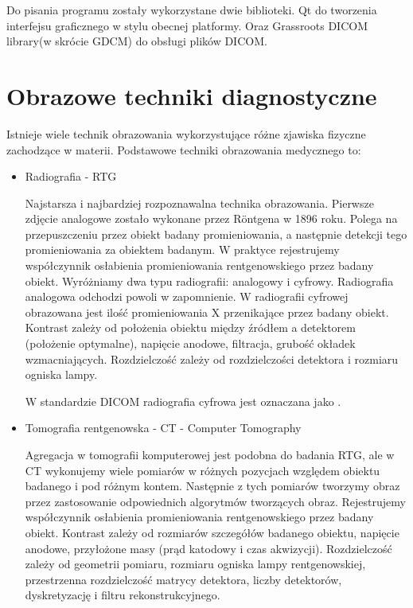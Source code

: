 Do pisania programu zostały wykorzystane dwie biblioteki. Qt do tworzenia interfejsu graficznego w stylu obecnej platformy. Oraz Grassroots DICOM library(w skrócie GDCM) do obsługi plików DICOM.

\section{Obrazowe techniki diagnostyczne}

Istnieje wiele technik obrazowania wykorzystujące różne zjawiska fizyczne zachodzące w materii.
Podstawowe techniki obrazowania medycznego to:
\label{sec:basic-imaging-technics}
\begin{itemize}
    \item Radiografia - RTG

    Najstarsza i najbardziej rozpoznawalna technika obrazowania.
    Pierwsze zdjęcie analogowe zostało wykonane przez Röntgena w 1896 roku.
    Polega na przepuszczeniu przez obiekt badany promieniowania, a następnie detekcji tego promieniowania za obiektem badanym.
    W praktyce rejestrujemy współczynnik osłabienia promieniowania rentgenowskiego przez badany obiekt.
    Wyróżniamy dwa typu radiografii: analogowy i cyfrowy.
    Radiografia analogowa odchodzi powoli w zapomnienie.
    W radiografii cyfrowej obrazowana jest ilość promieniowania X przenikające przez badany obiekt.
    Kontrast zależy od położenia obiektu między źródłem a detektorem (położenie optymalne), napięcie anodowe, filtracja, grubość okładek wzmacniających.
    Rozdzielczość zależy od rozdzielczości detektora i rozmiaru ogniska lampy.

    W standardzie DICOM radiografia cyfrowa jest oznaczana jako .

    \item Tomografia rentgenowska - CT - Computer Tomography
    
    Agregacja w tomografii komputerowej jest podobna do badania RTG, ale w CT wykonujemy wiele pomiarów w różnych pozycjach względem obiektu badanego i pod różnym kontem.
    Następnie z tych pomiarów tworzymy obraz przez zastosowanie odpowiednich algorytmów tworzących obraz.
    Rejestrujemy współczynnik osłabienia promieniowania rentgenowskiego przez badany obiekt.
    Kontrast zależy od rozmiarów szczegółów badanego obiektu, napięcie anodowe, przyłożone masy (prąd katodowy i czas akwizycji).
    Rozdzielczość zależy od geometrii pomiaru, rozmiaru ogniska lampy rentgenowskiej, przestrzenna rozdzielczość matrycy detektora, liczby detektorów, dyskretyzację i filtru rekonstrukcyjnego.


\end{itemize}
